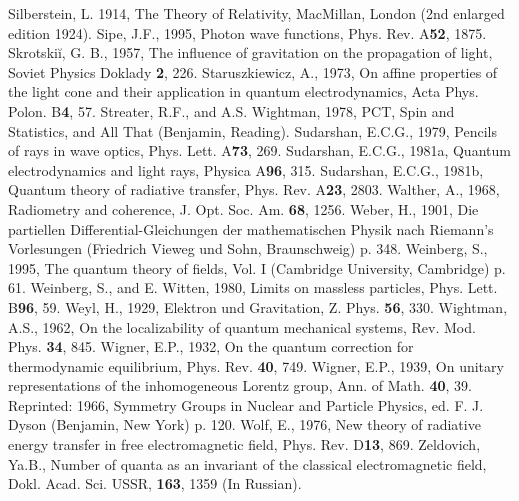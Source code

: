 \documentclass[11pt]{article}
\begin{document}
\begin{thebibliography}{References}
 Silberstein, L. 1914, The
Theory of Relativity, MacMillan, London (2nd enlarged edition 1924).
 Sipe, J.F., 1995, Photon wave functions,
Phys. Rev. A{\bf 52}, 1875.
 Skrotski\u i, G. B., 1957, The
influence of gravitation on the propagation of light, Soviet Physics Doklady
{\bf 2}, 226.
 Staruszkiewicz, A.,
1973, On affine properties of the light cone and their application in
quantum electrodynamics, Acta Phys. Polon. B{\bf 4}, 57.
 Streater, R.F., and A.S.
Wightman, 1978, PCT, Spin and Statistics, and All That (Benjamin, Reading).
 Sudarshan, E.C.G., 1979,
Pencils of rays in wave optics, Phys. Lett. A{\bf 73}, 269.
 Sudarshan, E.C.G., 1981a,
Quantum electrodynamics and light rays, Physica A{\bf 96}, 315.
 Sudarshan, E.C.G., 1981b,
Quantum theory of radiative transfer, Phys. Rev. A{\bf 23}, 2803.
 Walther, A., 1968, Radiometry and
coherence, J. Opt. Soc. Am. {\bf 68}, 1256.
 Weber, H., 1901, Die partiellen
Differential-Gleichungen der mathematischen Physik nach Riemann's
Vorlesungen (Friedrich Vieweg und Sohn, Braunschweig) p. 348.
 Weinberg, S., 1995, The quantum
theory of fields,  Vol. I (Cambridge University, Cambridge) p. 61.
 Weinberg, S., and E. Witten,
1980, Limits on massless particles, Phys. Lett. B{\bf 96}, 59.
 Weyl, H., 1929, Elektron und Gravitation,
Z. Phys. {\bf 56}, 330.
 Wightman, A.S., 1962, On the
localizability of quantum mechanical systems, Rev. Mod. Phys. {\bf 34}, 845.
 Wigner, E.P., 1932, On the quantum
correction for thermodynamic equilibrium, Phys. Rev. {\bf 40}, 749.
 Wigner, E.P., 1939, On unitary
representations of the inhomogeneous Lorentz group, Ann. of Math. {\bf 40},
39. Reprinted: 1966, Symmetry Groups in Nuclear and Particle Physics, ed. F. J.
Dyson (Benjamin, New York) p. 120.
 Wolf, E., 1976, New theory of radiative
energy transfer in free electromagnetic field, Phys. Rev. D{\bf 13}, 869.
 Zeldovich, Ya.B., Number of
quanta as an invariant of the classical electromagnetic field, Dokl. Acad.
Sci. USSR, {\bf 163}, 1359 (In Russian).

\end{thebibliography}
\end{document}
